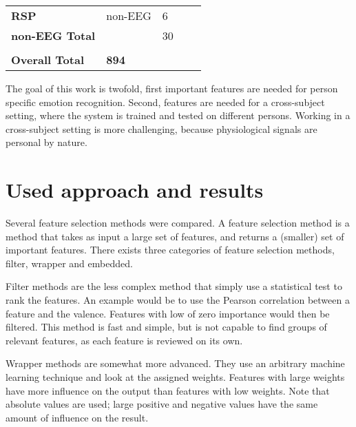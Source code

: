 \documentclass[12pt,journal,compsoc]{IEEEtran}
\newcommand{\npar}{\par \vspace{2.3ex plus 0.3ex minus 0.3ex}}
\begin{document}
\begin{table}[H]
\begin{tabular}{l|llll}
\textbf{RSP}            & non-EEG       & 6                             &                           &              \\
\textbf{non-EEG Total}  &               & 30                            &                           &              \\
                        &               &                               &                           &              \\ \hline
\textbf{Overall Total}  & \textbf{894}  &                               &                           &             
\end{tabular}
\end{table}

The goal of this work is twofold, first important features are needed for person specific emotion recognition. Second, features are needed for a cross-subject setting, where the system is trained and tested on different persons. Working in a cross-subject setting is more challenging, because physiological signals are personal by nature\citep{DEAP}.

\section{Used approach and results} \label{approach}

Several feature selection methods were compared. A feature selection method is a method that takes as input a large set of features, and returns a (smaller) set of important features. There exists three categories of feature selection methods, filter, wrapper and embedded.

\npar

Filter methods are the less complex method that simply use a statistical test to rank the features. An example would be to use the Pearson correlation between a feature and the valence. Features with low of zero importance would then be filtered. This method is fast and simple, but is not capable to find groups of relevant features, as each feature is reviewed on its own. 

\npar

Wrapper methods are somewhat more advanced. They use an arbitrary machine learning technique and look at the assigned weights. Features with large weights have more influence on the output than features with low weights. Note that absolute values are used; large positive and negative values have the same amount of influence on the result. 

\npar
\end{document}
